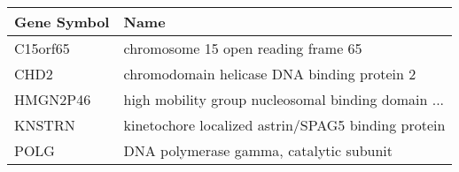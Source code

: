 \begin{tabular}{ll}
\toprule
Gene Symbol &                                               Name \\
\midrule
   C15orf65 &                chromosome 15 open reading frame 65 \\
       CHD2 &        chromodomain helicase DNA binding protein 2 \\
   HMGN2P46 & high mobility group nucleosomal binding domain ... \\
     KNSTRN & kinetochore localized astrin/SPAG5 binding protein \\
       POLG &            DNA polymerase gamma, catalytic subunit \\
\bottomrule
\end{tabular}
